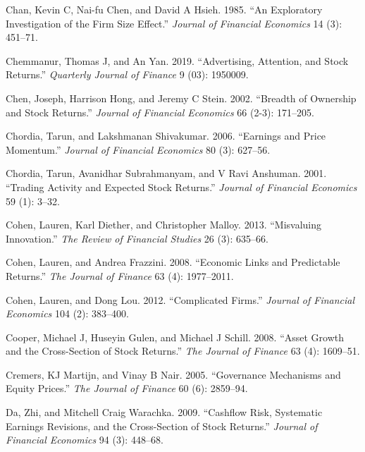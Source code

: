 \documentclass[
  letterpaper,
  DIV=11,
  numbers=noendperiod]{scrreprt}
\newlength{\cslhangindent}
\newlength{\cslentryspacingunit} %
\newenvironment{CSLReferences}[2] %
 {%
  \setlength{\parindent}{0pt}
  \ifodd #1
  \let\oldpar\par
  \def\par{\hangindent=\cslhangindent\oldpar}
  \fi
  \setlength{\parskip}{#2\cslentryspacingunit}
 }%
 {}
\begin{document}
\begin{CSLReferences}{1}{0}
\leavevmode{}%
Chan, Kevin C, Nai-fu Chen, and David A Hsieh. 1985. {``An Exploratory
Investigation of the Firm Size Effect.''} \emph{Journal of Financial
Economics} 14 (3): 451--71.

\leavevmode{}%
Chemmanur, Thomas J, and An Yan. 2019. {``Advertising, Attention, and
Stock Returns.''} \emph{Quarterly Journal of Finance} 9 (03): 1950009.

\leavevmode{}%
Chen, Joseph, Harrison Hong, and Jeremy C Stein. 2002. {``Breadth of
Ownership and Stock Returns.''} \emph{Journal of Financial Economics} 66
(2-3): 171--205.

\leavevmode{}%
Chordia, Tarun, and Lakshmanan Shivakumar. 2006. {``Earnings and Price
Momentum.''} \emph{Journal of Financial Economics} 80 (3): 627--56.

\leavevmode{}%
Chordia, Tarun, Avanidhar Subrahmanyam, and V Ravi Anshuman. 2001.
{``Trading Activity and Expected Stock Returns.''} \emph{Journal of
Financial Economics} 59 (1): 3--32.

\leavevmode{}%
Cohen, Lauren, Karl Diether, and Christopher Malloy. 2013. {``Misvaluing
Innovation.''} \emph{The Review of Financial Studies} 26 (3): 635--66.

\leavevmode{}%
Cohen, Lauren, and Andrea Frazzini. 2008. {``Economic Links and
Predictable Returns.''} \emph{The Journal of Finance} 63 (4):
1977--2011.

\leavevmode{}%
Cohen, Lauren, and Dong Lou. 2012. {``Complicated Firms.''}
\emph{Journal of Financial Economics} 104 (2): 383--400.

\leavevmode{}%
Cooper, Michael J, Huseyin Gulen, and Michael J Schill. 2008. {``Asset
Growth and the Cross-Section of Stock Returns.''} \emph{The Journal of
Finance} 63 (4): 1609--51.

\leavevmode{}%
Cremers, KJ Martijn, and Vinay B Nair. 2005. {``Governance Mechanisms
and Equity Prices.''} \emph{The Journal of Finance} 60 (6): 2859--94.

\leavevmode{}%
Da, Zhi, and Mitchell Craig Warachka. 2009. {``Cashflow Risk, Systematic
Earnings Revisions, and the Cross-Section of Stock Returns.''}
\emph{Journal of Financial Economics} 94 (3): 448--68.


\end{CSLReferences}
\end{document}
